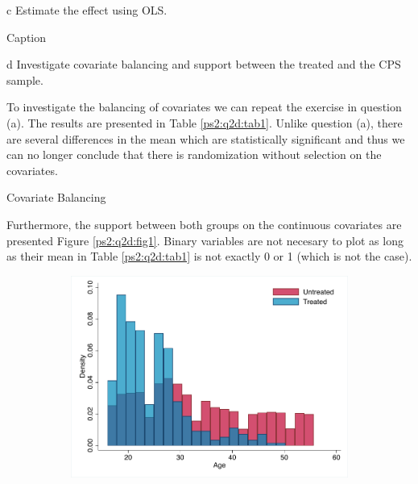 \documentclass{article}
\begin{document}
\begin{problem}{c}
Estimate the effect using OLS.
\end{problem}
\begin{solution}
\begin{table}[htb]
    \centering
    \caption{Caption}
    \label{tab:my_label}
    
\end{table}
\end{solution}

\begin{problem}{d}
Investigate covariate balancing and support between the treated and the CPS sample.
\end{problem}
\begin{solution}
To investigate the balancing of covariates we can repeat the exercise in question (a). The results are presented in Table \ref{ps2:q2d:tab1}. Unlike question (a), there are several differences in the mean which are statistically significant and thus we can no longer conclude that there is randomization without selection on the covariates. 
\begin{table}[htb]
    \centering
    \caption{Covariate Balancing}
    \label{ps2:q2d:tab1}
 
\end{table}
Furthermore, the support between both groups on the continuous covariates are presented Figure \ref{ps2:q2d:fig1}. Binary variables are not necesary to plot as long as their mean in Table \ref{ps2:q2d:tab1} is not exactly 0 or 1 (which is not the case). 
\begin{figure}[htb]
    \centering
    \caption{Covariates Balancing}
    \label{ps2:q2d:fig1}
    \begin{subfigure}[b]{0.4\textwidth}
         \centering
         \includegraphics[width=\textwidth]{ps2/Figures/ps2_q2d_age.pdf}

\end{subfigure}
\end{figure}
\end{solution}
\end{document}
